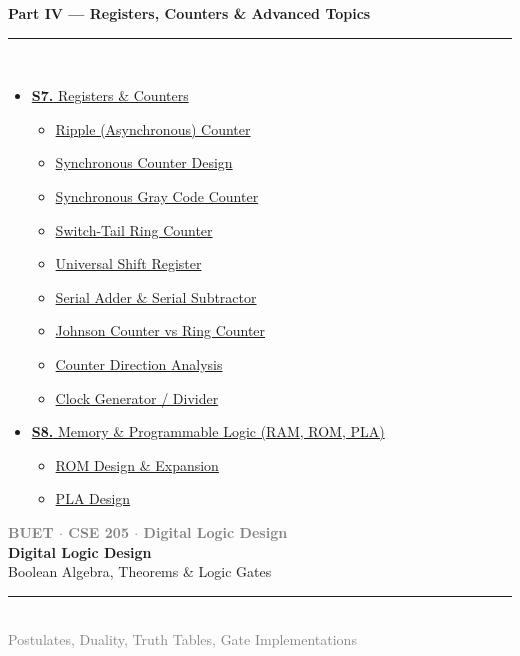\documentclass[12pt,a4paper]{article}
\newcommand{\secdivider}[4]{%
  \newpage\thispagestyle{empty}%
  \vspace*{\fill}%
  \begin{tcolorbox}[enhanced,colback=#4!7,colframe=#3,boxrule=1.5pt,arc=8pt,
    left=20pt,right=20pt,top=22pt,bottom=22pt,
    shadow={3pt}{-3pt}{0pt}{black!15}]
    \centering
    {\large\textcolor{gray}{\textbf{BUET $\cdot$ CSE 205 $\cdot$ Digital Logic Design}}}\\[8pt]
    {\fontsize{26}{32}\selectfont\bfseries\textcolor{#3}{Digital Logic Design}}\\[6pt]
    {\fontsize{15}{19}\selectfont\textcolor{dgray}{#1}}\\[12pt]
    \textcolor{#3!60}{\rule{0.5\textwidth}{0.5pt}}\\[6pt]
    {\small\textcolor{gray}{#2}}
  \end{tcolorbox}%
  \vspace*{\fill}\newpage%
}
\begin{document}
\begin{tcolorbox}[breakable,colback=cG!5,colframe=cG,boxrule=1pt,arc=5pt,
  left=8pt,right=8pt,top=8pt,bottom=8pt,before skip=4pt]
  {\large\bfseries\textcolor{cG}{Part IV --- Registers, Counters \& Advanced Topics}}\\[5pt]
  \textcolor{cG!40}{\rule{\textwidth}{0.4pt}}\\[3pt]
  \small\begin{itemize}[leftmargin=1.2em,itemsep=1pt,label={\textcolor{cG}{$\triangleright$}}]
    \item \hyperref[sec:S7]{\textbf{S7.} Registers \& Counters}
      \begin{itemize}[leftmargin=1.5em,itemsep=0pt,label={\textcolor{cG}{$\cdot$}}]
        \item \hyperref[sub:s7-ripple]{Ripple (Asynchronous) Counter}
        \item \hyperref[sub:s7-sync-counter]{Synchronous Counter Design}
        \item \hyperref[sub:s7-gray]{Synchronous Gray Code Counter}
        \item \hyperref[sub:s7-ring]{Switch-Tail Ring Counter}
        \item \hyperref[sub:s7-universal]{Universal Shift Register}
        \item \hyperref[sub:s7-serial]{Serial Adder \& Serial Subtractor}
        \item \hyperref[sub:s7-johnson]{Johnson Counter vs Ring Counter}
        \item \hyperref[sub:s7-direction]{Counter Direction Analysis}
        \item \hyperref[sub:s7-clock]{Clock Generator / Divider}
      \end{itemize}
    \item \hyperref[sec:S8]{\textbf{S8.} Memory \& Programmable Logic (RAM, ROM, PLA)}
      \begin{itemize}[leftmargin=1.5em,itemsep=0pt,label={\textcolor{cG}{$\cdot$}}]
        \item \hyperref[sub:s8-rom]{ROM Design \& Expansion}
        \item \hyperref[sub:s8-pla]{PLA Design}
      \end{itemize}
  \end{itemize}
\end{tcolorbox}

\newpage

\secdivider{Boolean Algebra, Theorems \& Logic Gates}{Postulates, Duality, Truth Tables, Gate Implementations}{cA}{red}
\end{document}
